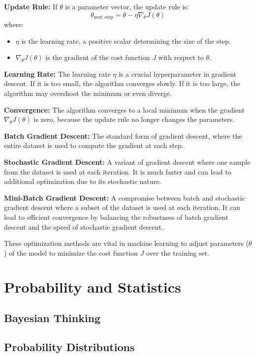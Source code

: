 \documentclass{article}
\begin{document}
	\textbf{Update Rule:}
	If \( \theta \) is a parameter vector, the update rule is:
	\[
	\theta_{\text{next step}} = \theta - \eta \nabla_\theta J(\theta)
	\]
	where:
	\begin{itemize}
		\item \( \eta \) is the learning rate, a positive scalar determining the size of the step.
		\item \( \nabla_\theta J(\theta) \) is the gradient of the cost function \( J \) with respect to \( \theta \).
	\end{itemize}
	
	\textbf{Learning Rate:}
	The learning rate \( \eta \) is a crucial hyperparameter in gradient descent. If it is too small, the algorithm converges slowly. If it is too large, the algorithm may overshoot the minimum or even diverge.
	
	\textbf{Convergence:}
	The algorithm converges to a local minimum when the gradient \( \nabla_\theta J(\theta) \) is zero, because the update rule no longer changes the parameters.
	
	\textbf{Batch Gradient Descent:}
	The standard form of gradient descent, where the entire dataset is used to compute the gradient at each step.
	
	\textbf{Stochastic Gradient Descent:}
	A variant of gradient descent where one sample from the dataset is used at each iteration. It is much faster and can lead to additional optimization due to its stochastic nature.
	
	\textbf{Mini-Batch Gradient Descent:}
	A compromise between batch and stochastic gradient descent where a subset of the dataset is used at each iteration. It can lead to efficient convergence by balancing the robustness of batch gradient descent and the speed of stochastic gradient descent.
	
	These optimization methods are vital in machine learning to adjust parameters (\( \theta \)) of the model to minimize the cost function \( J \) over the training set.
	
	\section{Probability and Statistics}
	\subsection{Bayesian Thinking}
	\subsection{Probability Distributions}
\end{document}
